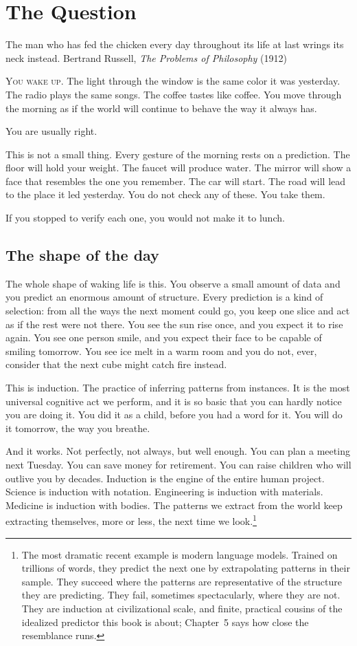 \chapter{The Question}

\chapterepigraph
{The man who has fed the chicken every day throughout its life at last wrings its neck instead.}
{Bertrand Russell, \textit{The Problems of Philosophy} (1912)}

\noindent \textsc{You wake up.} The light through the window is the same color it was yesterday. The radio plays the same songs. The coffee tastes like coffee. You move through the morning as if the world will continue to behave the way it always has.

You are usually right.

This is not a small thing. Every gesture of the morning rests on a prediction. The floor will hold your weight. The faucet will produce water. The mirror will show a face that resembles the one you remember. The car will start. The road will lead to the place it led yesterday. You do not check any of these. You take them.

If you stopped to verify each one, you would not make it to lunch.

\section*{The shape of the day}

The whole shape of waking life is this. You observe a small amount of data and you predict an enormous amount of structure. Every prediction is a kind of selection: from all the ways the next moment could go, you keep one slice and act as if the rest were not there. You see the sun rise once, and you expect it to rise again. You see one person smile, and you expect their face to be capable of smiling tomorrow. You see ice melt in a warm room and you do not, ever, consider that the next cube might catch fire instead.

This is induction. The practice of inferring patterns from instances. It is the most universal cognitive act we perform, and it is so basic that you can hardly notice you are doing it. You did it as a child, before you had a word for it. You will do it tomorrow, the way you breathe.

And it works. Not perfectly, not always, but well enough. You can plan a meeting next Tuesday. You can save money for retirement. You can raise children who will outlive you by decades. Induction is the engine of the entire human project. Science is induction with notation. Engineering is induction with materials. Medicine is induction with bodies. The patterns we extract from the world keep extracting themselves, more or less, the next time we look.\footnote{The most dramatic recent example is modern language models. Trained on trillions of words, they predict the next one by extrapolating patterns in their sample. They succeed where the patterns are representative of the structure they are predicting. They fail, sometimes spectacularly, where they are not. They are induction at civilizational scale, and finite, practical cousins of the idealized predictor this book is about; Chapter~5 says how close the resemblance runs.}

